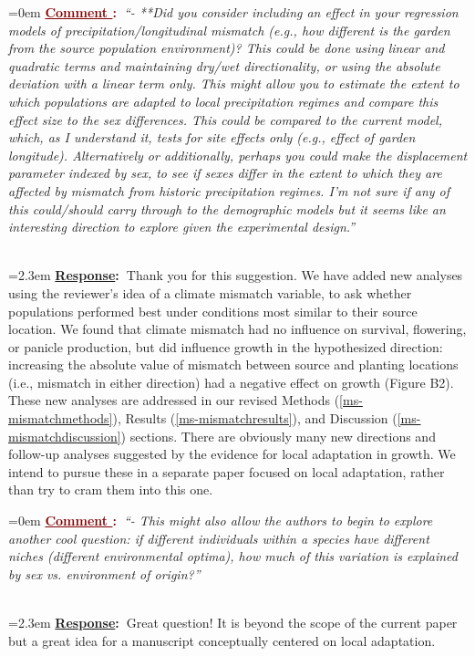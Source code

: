 \documentclass[12pt]{article}
\newcounter{cN}
\newcommand{\comment}[1]{
	\vspace{2em}
	\refstepcounter{cN} %
	\noindent \hangindent=0em \textbf{\textcolor{Maroon}{\uline{Comment \thecN}:~}}\emph{``#1''}
	}
\newcommand{\response}[1]{
	\\[0.25em]
	\hangindent=2.3em \textbf{\textcolor{NavyBlue}{\uline{Response}:~}}#1
	}
\begin{document}
\comment{- **Did you consider including an effect in your regression models of precipitation/longitudinal mismatch (e.g., how different is the garden from the source population environment)? This could be done using linear and quadratic terms and maintaining dry/wet directionality, or using the absolute deviation with a linear term only. This might allow you to estimate the extent to which populations are adapted to local precipitation regimes and compare this effect size to the sex differences. This could be compared to the current model, which, as I understand it, tests for site effects only (e.g., effect of garden longitude). Alternatively or additionally, perhaps you could make the displacement parameter indexed by sex, to see if sexes differ in the extent to which they are affected by mismatch from historic precipitation regimes. I'm not sure if any of this could/should carry through to the demographic models but it seems like an interesting direction to explore given the experimental design.}
\response{Thank you for this suggestion. We have added new analyses using the reviewer's idea of a climate mismatch variable, to ask whether populations performed best under conditions most similar to their source location. We found that climate mismatch had no influence on survival, flowering, or panicle production, but did influence growth in the hypothesized direction: increasing the absolute value of mismatch between source and planting locations (i.e., mismatch in either direction) had a negative effect on growth (Figure B2). These new analyses are addressed in our revised Methods (\ref{ms-mismatchmethods}), Results (\ref{ms-mismatchresults}), and Discussion (\ref{ms-mismatchdiscussion}) sections. There are obviously many new directions and follow-up analyses suggested by the evidence for local adaptation in growth. We intend to pursue these in a separate paper focused on local adaptation, rather than try to cram them into this one.}
	
\comment{- This might also allow the authors to begin to explore another cool question: if different individuals within a species have different niches (different environmental optima), how much of this variation is explained by sex vs. environment of origin?}
\response{Great question! It is beyond the scope of the current paper but a great idea for a manuscript conceptually centered on local adaptation.}
	
\end{document}
